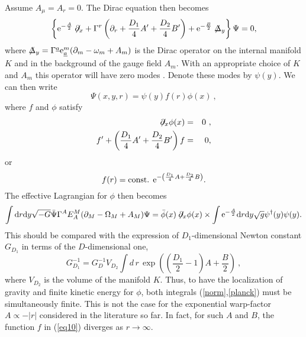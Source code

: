\documentclass[a4paper,12pt]{article}
\newcommand{\un}{\underline}
\begin{document}
Assume $A_\mu=A_r=0$. The Dirac equation then becomes
\begin{equation}
\label{eq6}
\left\{{\rm e}^{-\frac{A}{2}}\not\hspace{-0.1cm}
{\partial}_x+\Gamma^r\left(\partial_r
+{D_1\over 
4}A'+{D_2\over 4}B'\right)+{\rm e}^{-{B\over 2}}
\not\hspace{-0.1cm}{\Delta}_y\right\}\Psi=0,
\end{equation}
where $\not\hspace{-0.1cm}{\Delta}_y=\Gamma^{\un{a}}{\rm
e}_{\un{a}}^m(\partial_m-\omega_m+A_m)$ is the  Dirac operator on the
internal manifold $K$ and in the background of the gauge  field
$A_m$. With an appropriate choice of $K$ and $A_m$ this operator will
have zero modes \cite{witten}. Denote these modes by $\psi(y)$. We
can then write
\begin{equation}
\label{eq7}
\Psi(x,y,r)=\psi(y)f(r)\phi(x)~,
\end{equation}
where $f$ and $\phi$ satisfy
\begin{eqnarray}
\label{eq8}
\not\hspace{-0.1cm}{\partial}_x\phi(x)&=&0~,\\
f'+\left({D_1\over 4}A'+{D_2\over 4}B'\right)f&=&0,
\label{eq9}
\end{eqnarray}
or
\begin{equation}
\label{eq10}
f(r)=\mbox{const. }{\rm e}^{-\left({D_1\over 4}A+{D_2\over 4}B\right)}.
\end{equation}
The effective Lagrangian for $\phi$ then becomes
\begin{equation}
\int{\rm d}r{\rm d}y\sqrt{-G}{\bar \Psi}\Gamma^A E_A^M(\partial_M-\Omega_M+A_M)\Psi=
\bar{\phi}(x)\not\hspace{-0.1cm}{\partial}_x\phi(x)\times
\int {\rm e}^{-{A\over 2}}
{\rm d}r {\rm d}y  \sqrt{g}\psi^{\dagger}(y)\psi(y).
\label{norm}
\end{equation}
This should be compared with the expression of $D_1$-dimensional
Newton constant $G_{D_1}$ in terms of the $D$-dimensional one,
\begin{equation}
        G_{D_1}^{-1} = G_{D}^{-1} V_{D_2} \int d\,r\,
	\exp{\left((\frac{D_1}{2}-1)A +\frac{B}{2}\right)}~,
\label{planck}
\end{equation}
where $V_{D_2}$ is the volume of the manifold $K$.
Thus, to have the localization of gravity and finite kinetic energy
for $\phi$, both integrals (\ref{norm},\ref{planck}) must be
simultaneously finite. This is not the case for the exponential
warp-factor $ A \propto - |r|$ considered in the literature so far. 
In fact, for such $A$ and $B$, the function $f$ in (\ref{eq10})
diverges as $r \to \infty$.
\end{document}
